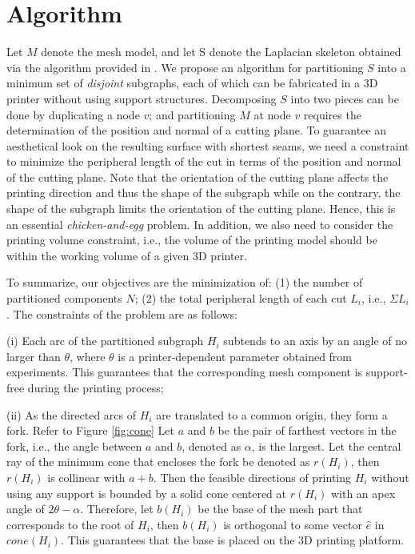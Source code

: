 \section{Algorithm}
Let $M$ denote the mesh model, and let S denote the Laplacian skeleton obtained via the algorithm provided in \cite{AuTCCL08}. We propose an algorithm for partitioning $S$ into a minimum set of \emph{disjoint} subgraphs, each of which can be fabricated in a 3D printer without using support structures. Decomposing $S$ into two pieces can be done by duplicating a node $v$; and partitioning $M$ at node $v$ requires the determination of the position and normal of a cutting plane. To guarantee an aesthetical look on the resulting surface with shortest seams, we need a constraint to minimize the peripheral length of the cut in terms of the position and normal of the cutting plane. Note that the orientation of the cutting plane affects the printing direction and thus the shape of the subgraph while on the contrary, the shape of the subgraph limits the orientation of the cutting plane. Hence, this is an essential \emph{chicken-and-egg} problem. In addition, we also need to consider the printing volume constraint, i.e., the volume of the printing model should be within the working volume of a given 3{D} printer.

To summarize, our objectives are the minimization of: (1) the number of partitioned components $N$; (2) the total peripheral length of each cut $L_i$, i.e., $\Sigma L_i$. The constraints of the problem are as follows:


(i) Each arc of the partitioned subgraph $H_i$ subtends to an axis by an angle of no larger than $\theta$, where $\theta$ is a printer-dependent parameter obtained from experiments. This guarantees that the corresponding mesh component is support-free during the printing process;


(ii) As the directed arcs of $H_i$ are translated to a common origin, they form a fork. Refer to Figure \ref{fig:cone} Let $a$ and $b$ be the pair of farthest vectors in the fork, i.e., the angle between $a$ and $b$, denoted as $\alpha$, is the largest. Let the central ray of the minimum cone that encloses the fork be denoted as $r(H_i)$, then $r(H_i)$ is collinear with $a + b$. Then the feasible directions of printing $H_i$ without using any support is bounded by a solid cone centered at $r(H_i)$ with an apex angle of $2\theta - \alpha$.
Therefore, let $b(H_i)$ be the base of the mesh part that corresponds to the root of $H_i$, then $b(H_i)$ is orthogonal to some vector $\hat{e}$ in $cone(H_i)$. This guarantees that the base is placed on the 3D printing platform.

